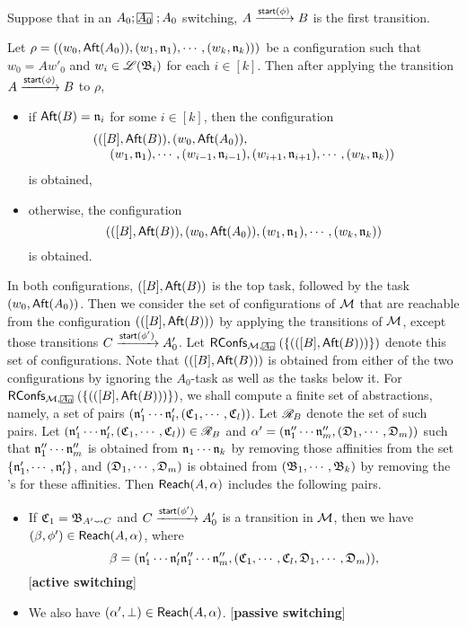 Suppose that in an $A_0;\mhcancel{A_0};A_0$ switching, $A \xrightarrow{{\mathsf{start} }(\phi)} B$ is the first transition. 

Let $\rho = ((w_0, {\sf Aft}(A_0)), (w_1, \mathfrak{n}_1), \cdots, (w_k, \mathfrak{n}_k)))$ be a configuration such that $w_0 = A w'_0$ and $w_i \in {\mathscr{L} }({\mathfrak{B} }_i)$ for each $i \in [k]$.
Then after applying the transition $A \xrightarrow{{\mathsf{start} }(\phi)} B$ to $\rho$, 
\begin{itemize}
\item if ${\sf Aft}(B) = \mathfrak{n}_i$ for some $i \in [k]$, then the configuration 
%
$$
\begin{array}{l}
(([B], {\sf Aft}(B)), (w_0, {\sf Aft}(A_0)),  \\
\ \ \ \ (w_1, \mathfrak{n}_1), \cdots, (w_{i-1}, \mathfrak{n}_{i-1}), (w_{i+1}, \mathfrak{n}_{i+1}), \cdots, (w_{k}, \mathfrak{n}_{k}))
\end{array}
$$ 
%
is obtained, 
%
\item otherwise, the configuration 
%
$$(([B], {\sf Aft}(B)), (w_0, {\sf Aft}(A_0)), (w_1, \mathfrak{n}_1), \cdots, (w_k, \mathfrak{n}_k))$$ 
%
is obtained. 
\end{itemize}
In both configurations, $([B], {\sf Aft}(B))$ is the top task, followed by the task $(w_0, {\sf Aft}(A_0))$. 
%
Then we consider the set of configurations of ${\mathcal{M} }$ that are reachable from the configuration $(([B], {\sf Aft}(B)))$ by applying the transitions of ${\mathcal{M} }$, except those transitions $C \xrightarrow{{\mathsf{start} }(\phi')} A'_0$. Let $\RConfs_{\Mm, \mhcancel{A_0}}(\{(([B], \aft(B)))\})$ denote this set of configurations. 
Note that $(([B], {\sf Aft}(B)))$ is obtained from either of the two configurations by ignoring the $A_0$-task as well as the tasks below it. 
%
For $\RConfs_{\Mm, \mhcancel{A_0}}(\{(([B], \aft(B)))\})$, we shall compute a finite set of abstractions, namely, a set of pairs $(\mathfrak{n}'_1 \cdots \mathfrak{n}'_l, ({\mathfrak{C} }_1, \cdots, {\mathfrak{C} }_l))$.
Let $\mathscr{R}_B$ denote the set of such pairs. 
Let $(\mathfrak{n}'_1 \cdots \mathfrak{n}'_l, ({\mathfrak{C} }_1, \cdots, {\mathfrak{C} }_l)) \in \mathscr{R}_B$ and $\alpha' = (\mathfrak{n}''_1 \cdots \mathfrak{n}''_m, ({\mathfrak{D} }_1, \cdots, {\mathfrak{D} }_m))$ such that $\mathfrak{n}''_1 \cdots \mathfrak{n}''_m$ is obtained from $\mathfrak{n}_1 \cdots \mathfrak{n}_k$ by removing those affinities from the set $\{\mathfrak{n}'_1, \cdots, \mathfrak{n}'_l\}$, and 
$({\mathfrak{D} }_1, \cdots, {\mathfrak{D} }_m)$ is obtained from $({\mathfrak{B} }_1, \cdots, {\mathfrak{B} }_k)$ by removing the {\WOTrNFA}'s for these affinities.  
Then ${\sf Reach}(A, \alpha)$ includes the following pairs. 
\begin{itemize}
\item If ${\mathfrak{C} }_1 = {\mathfrak{B} }_{A' \rightsquigarrow C}$ and 
$C \xrightarrow{{\mathsf{start} }(\phi')} A'_0$ is a transition in ${\mathcal{M} }$, then we have $(\beta, \phi') \in {\sf Reach}(A, \alpha)$, where  
$$\beta = (\mathfrak{n}'_1 \cdots \mathfrak{n}'_l \mathfrak{n}''_1 \cdots \mathfrak{n}''_m, ({\mathfrak{C} }_1, \cdots, {\mathfrak{C} }_l, {\mathfrak{D} }_1, \cdots, {\mathfrak{D} }_m)),$$
[{\bf active switching}]
%
\item We also have $(\alpha', \bot) \in {\sf Reach}(A, \alpha)$. [{\bf passive switching}]
\end{itemize}


